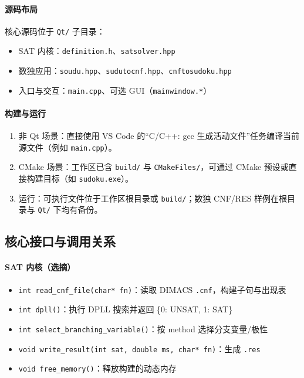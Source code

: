 \documentclass[UTF8]{ctexart}
\begin{document}
\paragraph{源码布局}
核心源码位于 \texttt{Qt/} 子目录：
\begin{itemize}
  \item SAT 内核：\texttt{definition.h}、\texttt{satsolver.hpp}
  \item 数独应用：\texttt{soudu.hpp}、\texttt{sudutocnf.hpp}、\texttt{cnftosudoku.hpp}
  \item 入口与交互：\texttt{main.cpp}、可选 GUI（\texttt{mainwindow.*}）
\end{itemize}

\paragraph{构建与运行}
\begin{enumerate}
  \item 非 Qt 场景：直接使用 VS Code 的“C/C++: gcc 生成活动文件”任务编译当前源文件（例如 \texttt{main.cpp}）。
  \item CMake 场景：工作区已含 \texttt{build/} 与 \texttt{CMakeFiles/}，可通过 CMake 预设或直接构建目标（如 \texttt{sudoku.exe}）。
  \item 运行：可执行文件位于工作区根目录或 \texttt{build/}；数独 CNF/RES 样例在根目录与 \texttt{Qt/} 下均有备份。
\end{enumerate}

\subsection{核心接口与调用关系}
\paragraph{SAT 内核（选摘）}
\begin{itemize}
  \item \texttt{int read\_cnf\_file(char* fn)}：读取 DIMACS \texttt{.cnf}，构建子句与出现表
  \item \texttt{int dpll()}：执行 DPLL 搜索并返回 \{0: UNSAT, 1: SAT\}
  \item \texttt{int select\_branching\_variable()}：按 method 选择分支变量/极性
  \item \texttt{void write\_result(int sat, double ms, char* fn)}：生成 \texttt{.res}
  \item \texttt{void free\_memory()}：释放构建的动态内存
\end{itemize}
\end{document}
